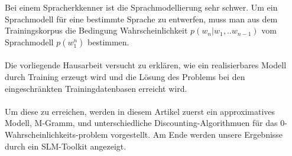 Bei einem Spracherkkenner ist die Sprachmodellierung sehr schwer. Um ein Sprachmodell f\"ur eine bestimmte Sprache zu entwerfen, muss man aus dem Trainingskorpus die Bedingung Wahrscheinlichkeit $p(w_{n}|w_{1},..w_{n-1})$   vom Sprachmodell $p(w_{1}^n)$   bestimmen.
\\
\\
Die vorliegende Hausarbeit versucht zu erkl\"aren, wie ein realisierbares Modell durch Training erzeugt wird und die L\"osung des Problems bei den eingeschr\"ankten Trainingdatenbasen erreicht wird. 
\\
\\
Um diese zu erreichen, werden in diesem Artikel zuerst ein approximatives Modell, M-Gramm, und unterschiedliche Discounting-Algorithmuen f\"ur das 0-Wahrscheinlichkeits-problem vorgestellt. Am Ende werden unsere Ergebnisse durch ein SLM-Toolkit angezeigt.
